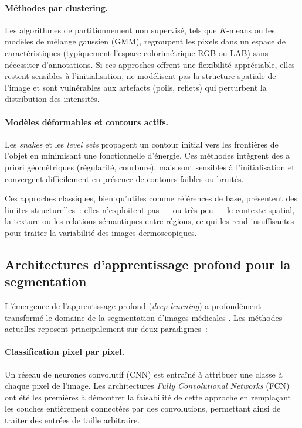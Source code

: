 \documentclass[12pt,a4paper]{article}
\begin{document}
\paragraph{Méthodes par clustering.} Les algorithmes de partitionnement non supervisé, tels que $K$-means \citep{macqueen1967kmeans} ou les modèles de mélange gaussien (GMM), regroupent les pixels dans un espace de caractéristiques (typiquement l'espace colorimétrique RGB ou LAB) sans nécessiter d'annotations. Si ces approches offrent une flexibilité appréciable, elles restent sensibles à l'initialisation, ne modélisent pas la structure spatiale de l'image et sont vulnérables aux artefacts (poils, reflets) qui perturbent la distribution des intensités.

\paragraph{Modèles déformables et contours actifs.} Les \emph{snakes} \citep{kass1988snakes} et les \emph{level sets} propagent un contour initial vers les frontières de l'objet en minimisant une fonctionnelle d'énergie. Ces méthodes intègrent des a priori géométriques (régularité, courbure), mais sont sensibles à l'initialisation et convergent difficilement en présence de contours faibles ou bruités.

Ces approches classiques, bien qu'utiles comme références de base, présentent des limites structurelles~: elles n'exploitent pas --- ou très peu --- le contexte spatial, la texture ou les relations sémantiques entre régions, ce qui les rend insuffisantes pour traiter la variabilité des images dermoscopiques.

\subsection{Architectures d'apprentissage profond pour la segmentation}

L'émergence de l'apprentissage profond (\emph{deep learning}) a profondément transformé le domaine de la segmentation d'images médicales \citep{liu2021review}. Les méthodes actuelles reposent principalement sur deux paradigmes~:

\paragraph{Classification pixel par pixel.} Un réseau de neurones convolutif (CNN) est entraîné à attribuer une classe à chaque pixel de l'image. Les architectures \emph{Fully Convolutional Networks} (FCN) \citep{long2015fully} ont été les premières à démontrer la faisabilité de cette approche en remplaçant les couches entièrement connectées par des convolutions, permettant ainsi de traiter des entrées de taille arbitraire.
\end{document}
